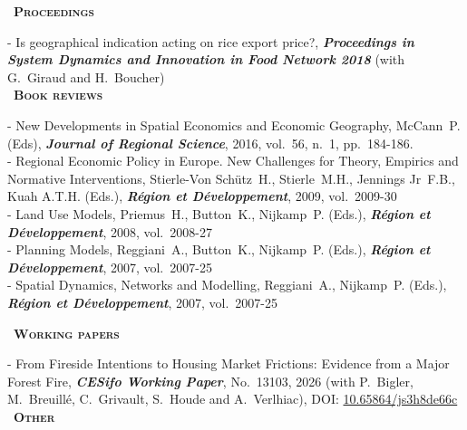 \documentclass[a4paper,12pt]{article}
\newcommand{\smalltitre}[1]{%
	\noindent \textbullet~\textsc{\textbf{#1}}
	\smallskip
	}
\begin{document}

\smalltitre{Proceedings}\medskip

\noindent - Is geographical indication acting on rice export price?, \textit{\textbf{Proceedings in System Dynamics and Innovation in Food Network 2018}} (with G.~Giraud and H.~Boucher) \\


\smalltitre{Book reviews}\medskip

\noindent - New Developments in Spatial Economics and Economic Geography, McCann~P. (Eds), \textit{\textbf{Journal of Regional Science}}, 2016, vol.~56, n.~1, pp.~184-186. \\
- Regional Economic Policy in Europe. New Challenges for Theory, Empirics and Normative Interventions, Stierle-Von Schütz~H., Stierle~M.H., Jennings Jr~F.B., Kuah A.T.H. (Eds.), \textit{\textbf{Région et Développement}}, 2009, vol.~2009-30 \\
- Land Use Models, Priemus~H., Button~K., Nijkamp~P. (Eds.), \textit{\textbf{Région et Développement}}, 2008, vol.~2008-27 \\
- Planning Models, Reggiani~A., Button~K., Nijkamp~P. (Eds.), \textit{\textbf{Région et Développement}}, 2007, vol.~2007-25 \\
- Spatial Dynamics, Networks and Modelling, Reggiani~A., Nijkamp~P. (Eds.), \textit{\textbf{Région et Développement}}, 2007, vol.~2007-25 \\

\newpage


\smalltitre{Working papers}\medskip

\noindent - From Fireside Intentions to Housing Market Frictions: Evidence from a Major Forest Fire, \textit{\textbf{CESifo Working Paper}}, No.~13103, 2026 (with P.~Bigler, M.~Breuillé, C.~Grivault, S.~Houde and A.~Verlhiac), DOI: \href{https://doi.org/10.65864/js3h8de66c}{10.65864/js3h8de66c} \\


\smalltitre{Other}\medskip
\end{document}
